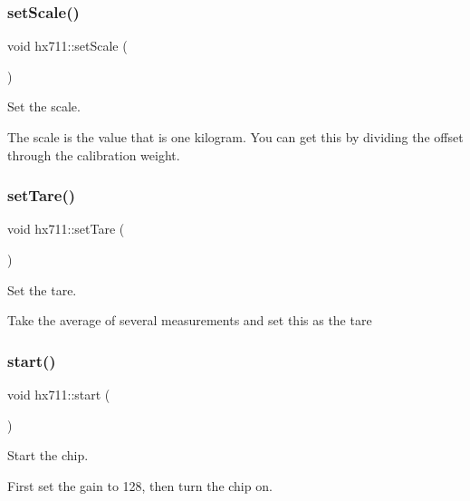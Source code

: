 \subsubsection{\texorpdfstring{set\+Scale()}{setScale()}}
{\footnotesize\ttfamily void hx711\+::set\+Scale (\begin{DoxyParamCaption}{ }\end{DoxyParamCaption})}



Set the scale. 

The scale is the value that is \textquotesingle{}one kilogram\textquotesingle{}. You can get this by dividing the offset through the calibration weight. \mbox{\label{classhx711_a5e40d399e913785d6e7fe7f247c6fe2a}} 
\subsubsection{\texorpdfstring{set\+Tare()}{setTare()}}
{\footnotesize\ttfamily void hx711\+::set\+Tare (\begin{DoxyParamCaption}{ }\end{DoxyParamCaption})}



Set the tare. 

Take the average of several measurements and set this as the tare \mbox{\label{classhx711_a2f9adaee6d128aec8ac6b9016f403203}} 
\subsubsection{\texorpdfstring{start()}{start()}\hspace{0.1cm}{\footnotesize\ttfamily [1/2]}}
{\footnotesize\ttfamily void hx711\+::start (\begin{DoxyParamCaption}{ }\end{DoxyParamCaption})\hspace{0.3cm}{\ttfamily [virtual]}}



Start the chip. 

First set the gain to 128, then turn the chip on. \mbox{\label{classhx711_aee8f8962d06e50888aa6f689c8d5fff2}} 
